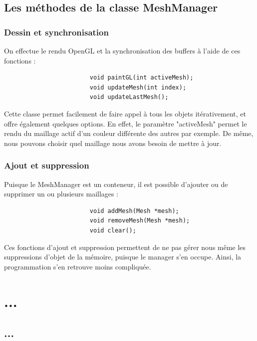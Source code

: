 \documentclass[a4paper]{memoir}
\begin{document}
			\subsection{Les méthodes de la classe MeshManager}
				\label{manager-dev}
				\subsubsection{Dessin et synchronisation}
					On effectue le rendu OpenGL et la synchronisation des buffers à l'aide de ces fonctions :
					\begin{verbatim}
						void paintGL(int activeMesh);
						void updateMesh(int index);
						void updateLastMesh();
					\end{verbatim}
					Cette classe permet facilement de faire appel à tous les objets itérativement, et offre également quelques options. En effet, le 
					paramètre "activeMesh" permet le rendu du maillage actif d'un couleur différente des autres par exemple. De même, nous pouvons choisir 
					quel maillage nous avons besoin de mettre à jour.
					
				\subsubsection{Ajout et suppression}
					Puisque le MeshManager est un conteneur, il est possible d'ajouter ou de supprimer un ou plusieurs maillages :
					\begin{verbatim}
						void addMesh(Mesh *mesh);
						void removeMesh(Mesh *mesh);
						void clear();
					\end{verbatim}
					Ces fonctions d'ajout et suppression permettent de ne pas gérer nous même les suppressions d'objet de la mémoire, puisque le manager 
					s'en occupe. Ainsi, la programmation s'en retrouve moins compliquée.
		
		\section{...}
			\subsection{...}

\end{document}
